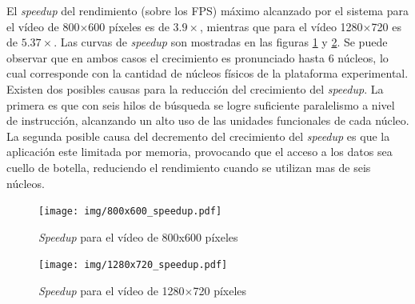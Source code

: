 El \emph{speedup} del rendimiento (sobre los FPS) máximo alcanzado por el
sistema para el vídeo de 800$\times$600 píxeles es de $3.9\times$, mientras que
para el vídeo 1280$\times$720 es de $5.37\times$. Las curvas de \emph{speedup}
son mostradas en las figuras \ref{speedUp800} y \ref{speedUp1280}. Se puede
observar que en ambos casos el crecimiento es pronunciado hasta 6 núcleos, lo
cual corresponde con la cantidad de núcleos físicos de la plataforma
experimental. Existen dos posibles causas para la reducción del crecimiento del
\emph{speedup}. La primera es que con seis hilos de búsqueda se logre suficiente
paralelismo a nivel de instrucción, alcanzando un alto uso de las unidades
funcionales de cada núcleo. La segunda posible causa del decremento del
crecimiento del \emph{speedup} es que la aplicación este limitada por memoria,
provocando que el acceso a los datos sea cuello de botella, reduciendo el
rendimiento cuando se utilizan mas de seis núcleos.

\begin{figure}[!h]

	\texttt{[image: img/800x600\_speedup.pdf]}
	\caption{\emph{Speedup} para el vídeo de 800x600 píxeles}
	\label{speedUp800}

\end{figure}

\begin{figure}[!h]

	\texttt{[image: img/1280x720\_speedup.pdf]}
	\caption{\emph{Speedup} para el vídeo de 1280$\times$720 píxeles}
	\label{speedUp1280}

\end{figure}
